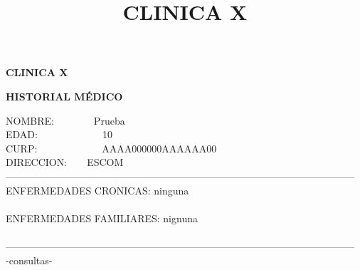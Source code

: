 \documentclass[10pt,a4paper]{letter}
\title{\bf CLINICA X}
\begin{document}
\begin{center}
{\scshape\LARGE \bf CLINICA X\par}
{\bf HISTORIAL MÉDICO\\}
\end{center}
NOMBRE:\ \ \ \ \ \ \ \ Prueba\\
EDAD:\ \ \ \ \ \ \ \ \ \ \ \ \ 10\\
CURP:\ \ \ \ \ \ \ \ \ \ \ \ \ AAAA000000AAAAAA00 \\
DIRECCION:\ \ \ \ ESCOM\\
--------------------------------------------------------------------------------------------------------- \\
ENFERMEDADES CRONICAS: ninguna\\ \\
ENFERMEDADES FAMILIARES: nignuna \\ \\
--------------------------------------------------------------------------------------------------------- \\-consultas-
\end{document}
